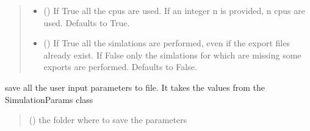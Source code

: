 \documentclass[letterpaper,10pt,english]{sphinxmanual}
\begin{document}
\begin{fulllineitems}
\begin{fulllineitems}
\begin{quote}
\begin{description}
\begin{itemize}
\item {} 
\sphinxAtStartPar
{} (\sphinxstyleliteralemphasis{\sphinxupquote{, }}) \textendash{} If True all the cpus are used. If an integer n is provided, n cpus are used. Defaults to True.

\item {} 
\sphinxAtStartPar
{} (\sphinxstyleliteralemphasis{\sphinxupquote{, }}) \textendash{} If True all the simlations are performed, even if the export files already exist. If False only the simlations for which are missing some exports are performed. Defaults to False.

\end{itemize}

\end{description}\end{quote}

\end{fulllineitems}


\begin{fulllineitems}
\label{\detokenize{code_documentation:raypyng.simulate.Simulate.save_parameters_to_file}}
\pysigstartsignatures
{}
\pysigstopsignatures
\sphinxAtStartPar
save all the user input parameters to file. It takes the values
from the SimulationParams class
\begin{quote}\begin{description}
\sphinxAtStartPar
{} () \textendash{} the folder where to save the parameters

\end{description}\end{quote}

\end{fulllineitems}



\end{fulllineitems}
\end{document}

